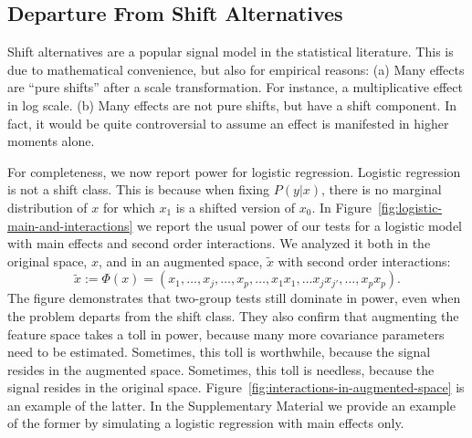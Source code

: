 \documentclass[oupdraft]{bio}
\begin{document}
\subsection{Departure From Shift Alternatives}
\label{sec:logistic}
Shift alternatives are a popular signal model in the statistical literature. 
This is due to mathematical convenience, but also for empirical reasons: 
(a) Many effects are ``pure shifts'' after a scale transformation. For instance, a multiplicative effect in log scale.
(b) Many effects are not pure shifts, but have a shift component. 
In fact, it would be quite controversial to assume an effect is manifested in higher moments alone. 

For completeness, we now report power for logistic regression.
Logistic regression is not a shift class. 
This is because when fixing $P(y|x)$, there is no marginal distribution of $x$ for which $x_1 $ is a shifted version of $x_0$.
In Figure~\ref{fig:logistic-main-and-interactions} we report the usual power of our tests for a logistic model with main effects and second order interactions.
We analyzed it both in the original space, $x$, and in an augmented space, $\tilde x$ with second order interactions:
$$\tilde{x}:=\Phi(x)=(x_1,\dots,x_j,\dots,x_p,\dots,x_1x_1,\dots x_jx_{j'},\dots,x_{p}x_{p}).$$
The figure demonstrates that two-group tests still dominate in power, even when the problem departs from the shift class.
They also confirm that augmenting the feature space takes a toll in power, because many more covariance parameters need to be estimated. 
Sometimes, this toll is worthwhile, because the signal resides in the augmented space. 
Sometimes, this toll is needless, because the signal resides in the original space. 
Figure~\ref{fig:interactions-in-augmented-space} is an example of the latter. 
In the Supplementary Material we provide an example of the former by simulating a logistic regression with main effects only.
\end{document}
